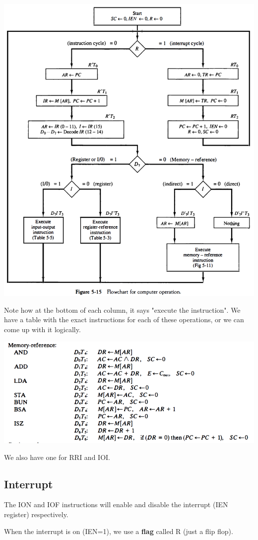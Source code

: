 \documentclass[12pt,letterpaper]{article} \usepackage{amsmath} \usepackage{graphicx} \usepackage[margin=1in]{geometry} \usepackage{longtable}  \usepackage{amssymb}
\begin{document}
			\begin{center}
				\includegraphics[width=0.7\linewidth]{instruction_cycle}
			\end{center}
		
			Note how at the bottom of each column, it says "execute the instruction". We have a table with the exact instructions for each of these operations, or we can come up with it logically. 
			
			\begin{center}
				\includegraphics[width=0.7\linewidth]{instructionsss}
			\end{center}
		
			We also have one for RRI and IOI.
			
			\subsection{Interrupt}
			The ION and IOF instructions will enable and disable the interrupt (IEN register) respectively. 
			
			When the interrupt is on (IEN=1), we use a \textbf{flag} called R (just a flip flop).
			
\end{document}
